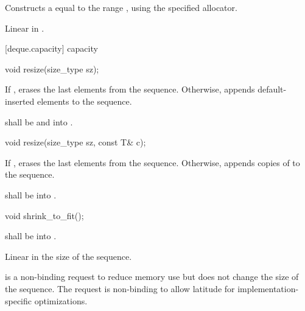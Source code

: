 \begin{itemdescr}
\pnum
\effects
Constructs a
equal to the range
,
using the specified allocator.

\pnum
\complexity Linear in .
\end{itemdescr}

[deque.capacity]{ capacity}

%
\begin{itemdecl}
void resize(size_type sz);
\end{itemdecl}

\begin{itemdescr}
\pnum
\effects If , erases the last  elements
from the sequence. Otherwise,
appends  default-inserted elements to the sequence.

\pnum
\requires {} shall be  and  into .
\end{itemdescr}

%
\begin{itemdecl}
void resize(size_type sz, const T& c);
\end{itemdecl}

\begin{itemdescr}
\pnum
\effects If , erases the last  elements
from the sequence. Otherwise,
appends  copies of  to the sequence.

\pnum
\requires {} shall be
 into .
\end{itemdescr}

%
%
\begin{itemdecl}
void shrink_to_fit();
\end{itemdecl}

\begin{itemdescr}
\pnum
\requires {} shall be  into .

\pnum
\complexity Linear in the size of the sequence.

\pnum
\remarks {} is a non-binding request to reduce memory use
but does not change the size of the sequence. \enternote The request is non-binding to allow latitude for implementation-specific optimizations. \exitnote
\end{itemdescr}

